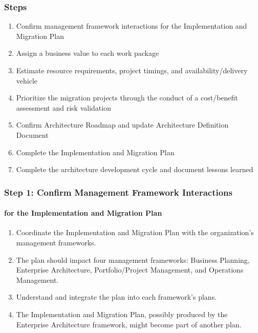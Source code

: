 \documentclass[aspectratio=169, table]{beamer}
\begin{document}
	\begin{frame}
		\frametitle{Steps}
		\vspace{20pt}
		\begin{enumerate}
			\item Confirm management framework interactions for the Implementation and Migration Plan
			\item Assign a business value to each work package
			\item Estimate resource requirements, project timings, and availability/delivery vehicle
			\item Prioritize the migration projects through the conduct of a cost/benefit assessment and risk validation
			\item Confirm Architecture Roadmap and update Architecture Definition Document
			\item Complete the Implementation and Migration Plan
			\item Complete the architecture development cycle and document lessons learned
		\end{enumerate}
	\end{frame}

	\begin{frame}
		\frametitle{Step 1: Confirm Management Framework Interactions}
		\framesubtitle{for the Implementation and Migration Plan}
		\vspace{20pt}
			\begin{enumerate}
				\item Coordinate the Implementation and Migration Plan with the organization's management frameworks.
				\item The plan should impact four management frameworks: Business Planning, Enterprise Architecture, Portfolio/Project Management, and Operations Management.
				\item Understand and integrate the plan into each framework's plans.
				\item The Implementation and Migration Plan, possibly produced by the Enterprise Architecture framework, might become part of another plan.
			\end{enumerate}
	\end{frame}
\end{document}

